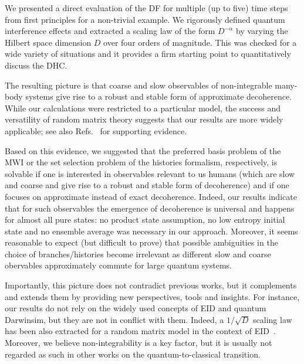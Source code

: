 \documentclass[pre,twocolumn,10pt,aps,longbibliography,nofootinbib]{revtex4-1}
\newcommand{\blue}[1]{#1}
\newcommand{\new}[1]{#1}
\begin{document}
We presented a direct evaluation of the DF for multiple (up to five) time steps from first principles for a non-trivial example. We rigorously defined quantum interference effects and extracted a scaling law of the form $D^{-\alpha}$ by varying the Hilbert space dimension $D$ over four orders of magnitude. \blue{This was checked for a wide variety of situations and it} provides a firm starting point to quantitatively discuss the DHC.

The resulting picture is that coarse and slow observables of non-integrable many-body systems give rise to a robust and stable form of approximate decoherence. \blue{While our calculations were restricted to a particular model, the success and versatility of random matrix theory suggests that our results are more widely applicable;} see also Refs.~\cite{VanKampenPhys1954, GemmerSteinigewegPRE2014, SchmidtkeGemmerPRE2016, NationPorrasPRE2020, AlbrechtBaunachArrasmithPRD2022, StrasbergEtAlPRA2023, StrasbergSP2023} for supporting evidence.

\blue{Based on this evidence, we suggested that the preferred basis problem of the MWI or the set selection problem of the histories formalism, respectively, is solvable if one is interested in observables relevant to us humans (which are slow and coarse and give rise to a robust and stable form of decoherence) and if one focuses on approximate instead of exact decoherence. Indeed, our results indicate that for such observables the emergence of decoherence is universal and happens for almost all pure states: no product state assumption, no low entropy initial state and no ensemble average was necessary in our approach. Moreover, it seems reasonable to expect (but difficult to prove) that possible ambiguities in the choice of branches/histories become irrelevant as different slow and coarse obervables approximately commute for large quantum systems.}

\new{Importantly,} this \new{picture} does not contradict previous works, but it complements and extends them by providing new perspectives, tools and insights. For instance, our results do not rely on the widely used concepts of EID and quantum Darwinsim, but they are not in conflict with them. \new{Indeed, a $1/\sqrt{D}$ scaling law has been also extracted for a random matrix model in the context of EID~\cite{HeWangPRE2014}.} Moreover, \new{we believe} non-integrability is a key factor, but it \new{is usually} not regarded as such in other works on the quantum-to-classical transition.
\end{document}
